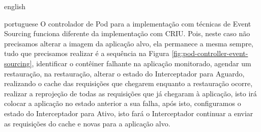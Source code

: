\begin{otherlanguage*}{english}
\begin{otherlanguage*}{portuguese}
O controlador de Pod para a implementação com técnicas de Event Sourcing funciona
diferente da implementação com CRIU. Pois, neste caso não precisamos alterar a imagem da
aplicação alvo, ela permanece a mesma sempre, tudo que precisamos realizar é a sequência
na Figura \ref{fig:pod-controller-event-sourcing}, identificar o contêiner falhante na 
aplicação monitorado, agendar um restauração, na restauração, alterar o estado do
Interceptador para Aguardo, realizando o cache das requisições que chegarem enquanto a
restauração ocorre, realizar a reprojeção de todas as requisições que já chegaram à
aplicação, isto irá colocar a aplicação no estado anterior a sua falha, após isto,
configuramos o estado do Interceptador para Ativo, isto fará o Interceptador continuar
a enviar as requisições do cache e novas para a aplicação alvo.


\end{otherlanguage*}
\end{otherlanguage*}
